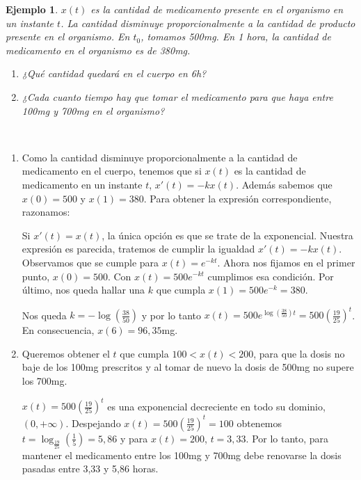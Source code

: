 \documentclass[11pt, a4paper,twoside]{article}
\makeatletter
\theoremstyle{theorem-style}  %
\renewenvironment{proof}[1][\proofname]{\par
	\pushQED{\qed}%
	\normalfont \topsep6\p@\@plus6\p@\relax
	\list{}{%
		\settowidth{\leftmargin}{\quad:\hskip\labelsep}%
		\setlength{\labelwidth}{0pt}%
		\setlength{\itemindent}{-\leftmargin}%
	}%
	\item[\hskip\labelsep\itshape#1\@addpunct{:}]\ignorespaces
}{%
	\popQED\endlist\@endpefalse
}
\theoremstyle{definition-style}
\theoremstyle{example-style}
\newtheorem{example}{Ejemplo}[section]
\makeatother
\begin{document}
\begin{example}
	$ x(t) $ es la cantidad de medicamento presente en el organismo en un instante $ t $. La cantidad disminuye proporcionalmente a la cantidad de producto presente en el organismo. En $ t_0 $, tomamos 500mg. En 1 hora, la cantidad de medicamento en el organismo es de 380mg.
	\begin{enumerate}[\qquad a)]
		\item ¿Qué cantidad quedará en el cuerpo en 6h?
		\item ¿Cada cuanto tiempo hay que tomar el medicamento para que haya entre 100mg y 700mg en el organismo? 
	\end{enumerate}
\end{example}
\begin{proof}[Solución] \ 
	\begin{enumerate}[\qquad a)]
		\item Como la cantidad disminuye proporcionalmente a la cantidad de medicamento en el cuerpo, tenemos que si $ x(t) $ es la cantidad de medicamento en un instante $ t $, $ x'(t)=-kx(t) $. Además sabemos que $ x(0)=500 $ y $ x(1)=380 $. Para obtener la expresión correspondiente, razonamos:

		Si $ x'(t)=x(t) $, la única opción es que se trate de la exponencial. Nuestra expresión es parecida, tratemos de cumplir la igualdad $ x'(t)=-kx(t) $. Observamos que se cumple para $ x(t)=e^{-kt} $. Ahora nos fijamos en el primer punto,  $ x(0)=500 $. Con  $ x(t)=500e^{-kt} $ cumplimos esa condición. Por último, nos queda hallar una $ k $ que cumpla $ x(1)=500e^{-k}=380 $. 
		
		Nos queda $ k=-\log(\frac{38}{50}) $ y por lo tanto $ x(t)=500e^{\log(\frac{38}{50})t} =500(\frac{19}{25})^t$. En consecuencia, $ x(6)=96,35 $mg.

		\item Queremos obtener el $ t $ que cumpla $ 100<x(t)<200 $, para que la dosis no baje de los 100mg prescritos y al tomar de nuevo la dosis de 500mg no supere los 700mg.

		$ x(t)=500(\frac{19}{25})^t$ es una exponencial decreciente en todo su dominio, $ (0, +\infty) $. Despejando $ x(t)=500(\frac{19}{25})^t=100$ obtenemos $ t=\log_{\frac{19}{25}}(\frac{1}{5})=5,86 $ y para $ x(t)=200 $, $ t=3,33 $. Por lo tanto, para mantener el medicamento entre los 100mg y 700mg debe renovarse la dosis pasadas entre 3,33 y 5,86 horas.
	\end{enumerate}
\end{proof}
\end{document}
